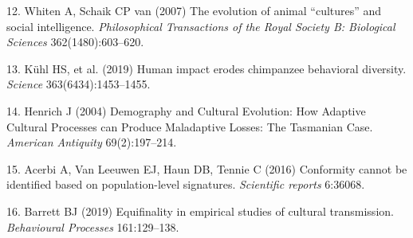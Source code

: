 \documentclass[9pt,twocolumn,twoside,]{pnas-new}
\begin{document}
\hypertarget{ref-whiten_evolution_2007}{}
12. Whiten A, Schaik CP van (2007) The evolution of animal ``cultures''
and social intelligence. \emph{Philosophical Transactions of the Royal
Society B: Biological Sciences} 362(1480):603--620.

\hypertarget{ref-kuhl_human_2019}{}
13. Kühl HS, et al. (2019) Human impact erodes chimpanzee behavioral
diversity. \emph{Science} 363(6434):1453--1455.

\hypertarget{ref-henrich_demography_2004}{}
14. Henrich J (2004) Demography and Cultural Evolution: How Adaptive
Cultural Processes can Produce Maladaptive Losses: The Tasmanian Case.
\emph{American Antiquity} 69(2):197--214.

\hypertarget{ref-acerbi_conformity_2016}{}
15. Acerbi A, Van Leeuwen EJ, Haun DB, Tennie C (2016) Conformity cannot
be identified based on population-level signatures. \emph{Scientific
reports} 6:36068.

\hypertarget{ref-barrett_equifinality_2019}{}
16. Barrett BJ (2019) Equifinality in empirical studies of cultural
transmission. \emph{Behavioural Processes} 161:129--138.



% 
\end{document}
